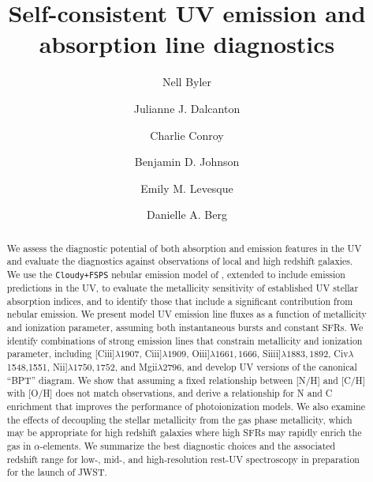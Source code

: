 \documentclass[preprint2]{aastex61}
\begin{document}
\title{Self-consistent UV emission and absorption line diagnostics}
\author[0000-0002-7392-3637]{Nell Byler}
\author[0000-0002-1264-2006]{Julianne J. Dalcanton}
\author[0000-0002-1590-8551]{Charlie Conroy}
\author{Benjamin D. Johnson}
\author[0000-0003-2184-1581]{Emily M. Levesque}
\author[0000-0002-4153-053X]{Danielle A. Berg}

\begin{abstract}

We assess the diagnostic potential of both absorption and emission features in the UV and evaluate the diagnostics against observations of local and high redshift galaxies. We use the {\tt Cloudy+FSPS} nebular emission model of \citet{Byler+2016}, extended to include emission predictions in the UV, to evaluate the metallicity sensitivity of established UV stellar absorption indices, and to identify those that include a significant contribution from nebular emission. We present model UV emission line fluxes as a function of metallicity and ionization parameter, assuming both instantaneous bursts and constant SFRs. We identify combinations of strong emission lines that constrain metallicity and ionization parameter, including [C{\sc iii}]$\lambda1907$, C{\sc iii}]$\lambda1909$, O{\sc iii}]$\lambda1661,1666$, Si{\sc iii}]$\lambda1883,1892$, C{\sc iv}$\lambda$1548,1551, N{\sc ii}]$\lambda1750,1752$, and Mg{\sc ii}$\lambda2796$, and develop UV versions of the canonical ``BPT'' diagram. We show that assuming a fixed relationship between [N/H] and [C/H] with [O/H] does not match observations, and derive a relationship for N and C enrichment that improves the performance of photoionization models. We also examine the effects of decoupling the stellar metallicity from the gas phase metallicity, which may be appropriate for high redshift galaxies where high SFRs may rapidly enrich the gas in $\alpha$-elements. We summarize the best diagnostic choices and the associated redshift range for low-, mid-, and high-resolution rest-UV spectroscopy in preparation for the launch of JWST.

\end{abstract}
\end{document}
